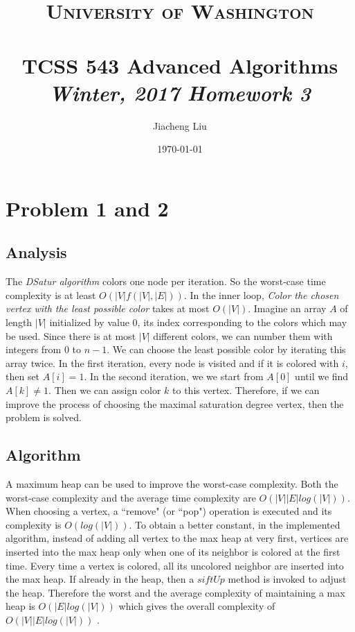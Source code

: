 \documentclass[paper=a4, fontsize=11pt]{scrartcl} %
\title{	
\normalfont \normalsize 
\textsc{University of Washington} \\ [25pt] %
\horrule{0.5pt} \\[0.3cm] %
\huge TCSS 543 Advanced Algorithms \\ %
\large \textit{Winter, 2017 Homework 3 }
}
\author{Jiacheng Liu} %
\date{\normalsize\today} %
\numberwithin{equation}{section} %
\numberwithin{figure}{section} %
\numberwithin{table}{section} %
\begin{document}
\maketitle %


\section{Problem 1 and 2 }

\subsection{Analysis}
The \textit{DSatur algorithm} colors one node per iteration. So the worst-case time complexity is at least $O(|V|f(|V|,|E|))$. In the inner loop, \textit{Color the chosen vertex with the least possible color} takes at most $O(|V|)$. Imagine an array $A$ of length $|V|$ initialized by value $0$, its index corresponding to the colors which may be used. Since there is at most $|V|$ different colors, we can number them with integers from $0$ to $n-1$. We can choose the least possible color by iterating this array twice. In the first iteration, every node is visited and if it is colored with $i$, then set $A[i]=1$. In the second iteration, we we start from $A[0]$ until we find $A[k] \neq 1 $. Then we can assign color $k$ to this vertex. Therefore, if we can improve the process of choosing the maximal saturation degree vertex, then the problem is solved. 

\subsection{Algorithm}
A maximum heap can be used to improve the worst-case complexity. Both the worst-case complexity and the average time complexity are $O(|V||E|log(|V|))$.  When choosing a vertex, a ``remove" (or ``pop") operation is executed and its complexity is $O(log(|V|))$. To obtain a better constant, in the implemented algorithm, instead of adding all vertex to the max heap at very first, vertices are inserted into the max heap only when one of its neighbor is colored at the first time. Every time a vertex is colored, all its uncolored neighbor are inserted into the max heap. If already in the heap, then a $siftUp$ method is invoked to adjust the heap. Therefore the worst and the average complexity of maintaining a max heap is $O(|E|log(|V|))$ which gives the overall complexity of $O(|V||E|log(|V|))$ .

\newpage
\end{document}
